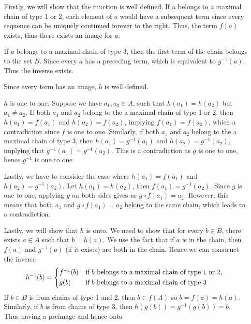 {{{            \item Firstly, we will show that the function is well defined.
            If $a$ belongs to a maximal chain of type 1 or 2, each element of $a$ would have a subsequent term since every sequence can be uniquely continued forever to the right. Thus, the term $f(a)$ exists, thus there exists an image for $a$.

            If $a$ belongs to a maximal chain of type 3, then the first term of the chain belongs to the set $B$. Since every $a$ has a preceding term, which is equivalent to $g^{-1}(a)$. Thus the inverse exists. 

            Since every term has an image, $h$ is well defined.

            $h$ is one to one. Suppose we have $a_1, a_2 \in A$, such that $h(a_1) = h(a_2)$ but $a_1 \ne a_2$. If both $a_1$ and $a_2$ belong to the a maximal chain of type 1 or 2, then $h(a_1) = f(a_1)$ and $h(a_2) = f(a_2)$, implying $f(a_1) = f(a_2)$, which a contradiction since $f$ is one to one. Similarly, if both $a_1$ and $a_2$ belong to the a maximal chain of type 3, then $h(a_1) = g^{-1} (a_1)$ and $h(a_2) = g^{-1} (a_2)$, implying that $g^{-1} (a_1) = g^{-1} (a_2)$. This is a contradiction as $g$ is one to one, hence $g^{-1}$ is one to one.

            Lastly, we have to consider the case where $h(a_1) = f(a_1)$ and $h(a_2) = g^{-1}(a_2)$. Let $h(a_1) = h(a_2)$, then $f(a_1) = g^{-1}(a_2)$. Since $g$ is one to one, applying $g$ on both sides gives us $g \circ f (a_1) = a_2$. However, this means that both $a_1$ and $g \circ f (a_1) = a_2$ belong to the same chain, which leads to a contradiction.

            Lastly, we will show that $h$ is onto. We need to show that for every $b \in B$, there exists $a \in A$ such that $b = h(a)$. We use the fact that if $a$ is in the chain, then $f(a)$ and $g^{-1}(a)$ (if it exists) are both in the chain. Hence we can construct the inverse
            \[
            h^{-1} (b) = 
            \begin{cases*}
            f^{-1} (b) & if $b$ belongs to a maximal chain of type 1 or 2, \\
            g(b) & if $b$ belongs to a maximal chain of type 3
            \end{cases*}
            \]
            If $b \in B$ is from chains of type 1 and 2, then $b \in f(A)$ so $b = f(a) = h(a)$. Similarly, if $b$ is from chains of type 3, then $h(g(b)) = g^{-1} (g(b)) = b$. Thus having a preimage and hence onto

}}}
